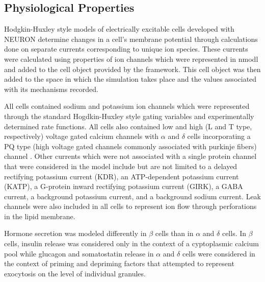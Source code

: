 \subsection{Physiological Properties}
Hodgkin-Huxley style models of electrically excitable cells developed with NEURON determine changes in a cell's membrane potential through calculations done on separate currents corresponding to unique ion species. These currents were calculated using properties of ion channels which were represented in nmodl and added to the cell object provided by the framework. This cell object was then added to the space in which the simulation takes place and the values associated with its mechanisms recorded. 
\par All cells contained sodium and potassium ion channels which were represented through the standard Hogdkin-Huxley style gating variables and experimentally determined rate functions. All cells also contained low and high (L and T type, respectively) voltage gated calcium channels with $\alpha$ and $\delta$ cells incorporating a PQ type (high voltage gated channels commonly associated with purkinje fibers) channel \cite{hashimoto_postsynaptic_2011}. Other currents which were not associated with a single protein channel that were considered in the model include but are not limited to a delayed rectifying potassium current (KDR), an ATP-dependent potassium current (KATP), a G-protein inward rectifying potassium current (GIRK), a GABA current, a background potassium current, and a background sodium current. Leak channels were also included in all cells to represent ion flow through perforations in the lipid membrane. 
\par Hormone secretion was modeled differently in $\beta$ cells than in $\alpha$ and $\delta$ cells. In $\beta$ cells, insulin release was considered only in the context of a cyptoplasmic calcium pool while glucagon and somatostatin release in $\alpha$ and $\delta$ cells were considered in the context of priming and depriming factors that attempted to represent exocytosis on the level of individual granules.

